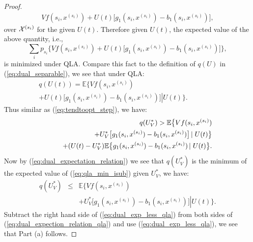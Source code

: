 \documentclass[journal]{IEEEtran}
\newcommand{\expect}[1]{\mathbb{E}\big\{#1\big\}}
\newcommand{\bv}[1]{{\boldsymbol{#1} }}
\newcommand{\script}[1]{{{\cal{#1} }}}
\begin{document}
\begin{proof}
\begin{eqnarray}
Vf(s_i, x^{(s_i)})+U(t)\big[g_1(s_i, x^{(s_i)})-b_1(s_i, x^{(s_i)})\big],\label{eq:qla_min_isub}
\end{eqnarray}
over $\script{X}^{(s_i)}$ for the given $U(t)$. Therefore given $U(t)$, the expected value of the above quantity, i.e.,
\[\sum_ip_{s_i}\bigg\{Vf(s_i, x^{(s_i)})+U(t)\big[g_1(s_i, x^{(s_i)})-b_1(s_i, x^{(s_i)})\big]\bigg\},\] 
is minimized under QLA. Compare this fact to the definition of $q(U)$ in (\ref{eq:dual_separable}), we see that under QLA:
\begin{eqnarray}
q(U(t))=\expect{Vf(s_i, x^{(s_i)})\label{eq:dual_expectation_relation}\qquad\qquad\qquad\qquad\qquad\qquad\\
+U(t)\big[g_1(s_i, x^{(s_i)})-b_1(s_i, x^{(s_i)})\big]\left|\right.U(t)}.\nonumber
\end{eqnarray}
Thus similar as (\ref{eq:tendtoopt_step}), we have:
\begin{eqnarray}
\hspace{-.3in}&&q(U^*_V)>\expect{Vf(s_i, x^{(s_i)})\label{eq:dual_expection_relation_qla}\\
\hspace{-.3in}&&\qquad\qquad+U^*_V\big[g_1(s_i, x^{(s_i)})-b_1(s_i, x^{(s_i)})\big]\left|\right.U(t)}\nonumber\\
\hspace{-.3in}&&\qquad\qquad+(U(t)-U_V^*)\expect{g_1(s_i, x^{(s_i)})-b_1(s_i, x^{(s_i)})\left|\right.U(t)}.\nonumber
\end{eqnarray}
Now by (\ref{eq:dual_expectation_relation}) we see that $q(U^*_V)$ is the minimum of the expected value of (\ref{eq:qla_min_isub}) given $U^*_V$, we have: 
\begin{eqnarray}
q(U^*_V)&\leq& \expect{Vf(s_i, x^{(s_i)})\label{eq:dual_exp_less_qla}\\
&&+U^*_V\big[g_1(s_i, x^{(s_i)})-b_1(s_i, x^{(s_i)})\big]\left|\right.U(t)}.\nonumber
\end{eqnarray}
Subtract the right hand side of (\ref{eq:dual_exp_less_qla}) from both sides of (\ref{eq:dual_expection_relation_qla}) and use (\ref{eq:dual_exp_less_qla}), we see that Part (a) follows.
\end{proof}

\end{document}
